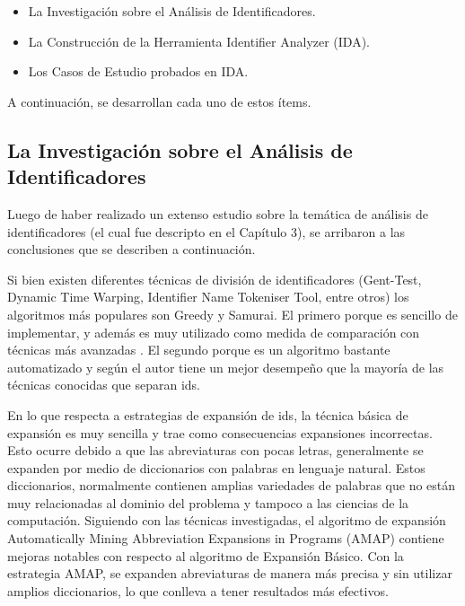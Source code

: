 \begin{itemize}

\item La Investigación sobre el Análisis de Identificadores.

\item La Construcción de la Herramienta Identifier Analyzer (IDA).

\item Los Casos de Estudio probados en IDA.

\end{itemize}

A continuación, se desarrollan cada uno de estos ítems.

\subsection{La Investigación sobre el Análisis de\\ Identificadores}

Luego de haber realizado un extenso estudio sobre la temática de análisis de identificadores (el cual fue descripto en el Capítulo 3), se arribaron a las conclusiones que se describen a continuación.

Si bien existen diferentes técnicas de división de identificadores (Gent-Test, Dynamic Time Warping,  Identifier Name Tokeniser Tool, entre otros) los algoritmos más populares son Greedy y Samurai. El primero porque es sencillo de implementar, y además es muy utilizado como medida de comparación con técnicas más avanzadas \cite{FBL06,HDD06,DLBD11,EDDLS13}. El segundo porque es un algoritmo bastante automatizado y según el autor \cite{EHPV09} tiene un mejor desempeño que la mayoría de las técnicas conocidas que separan ids.

En lo que respecta a estrategias de expansión de ids, la técnica básica de expansión es muy sencilla y trae como consecuencias expansiones incorrectas. Esto ocurre debido a que las abreviaturas con pocas letras, generalmente se expanden por medio de diccionarios con palabras en lenguaje natural. Estos diccionarios, normalmente contienen amplias variedades de palabras que no están muy relacionadas al dominio del problema y tampoco a las ciencias de la computación.
Siguiendo con las técnicas investigadas, el algoritmo de expansión Automatically Mining Abbreviation Expansions in Programs (AMAP) \cite{EZH08} contiene mejoras notables con respecto al algoritmo de Expansión Básico. Con la estrategia AMAP, se expanden abreviaturas de manera más precisa y sin utilizar amplios diccionarios, lo que conlleva a tener resultados más efectivos.

